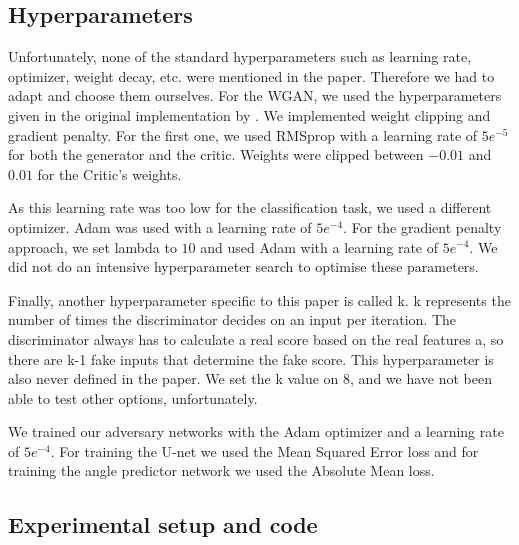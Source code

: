\subsection{Hyperparameters}

Unfortunately, none of the standard hyperparameters such as learning rate, optimizer, weight decay, etc. were mentioned in the paper. Therefore we had to adapt and choose them ourselves. For the WGAN, we used the hyperparameters given in the original implementation by \citet{pmlr-v70-arjovsky17a}.  We implemented weight clipping and gradient penalty. For the first one, we used RMSprop with a learning rate of $5e^{-5}$ for both the generator and the critic. Weights were clipped between $-0.01$ and $0.01$ for the Critic's weights. 

As this learning rate was too low for the classification task, we used a different optimizer. Adam was used with a learning rate of $5e^{-4}$. For the gradient penalty approach, we set lambda to $10$ and used Adam with a learning rate of $5e^{-4}$. We did not do an intensive hyperparameter search to optimise these parameters.

Finally, another hyperparameter specific to this paper is called k. k represents the number of times the discriminator decides on an input per iteration. The discriminator always has to calculate a real score based on the real features a, so there are k-1 fake inputs that determine the fake score. This hyperparameter is also never defined in the paper. We set the k value on 8, and we have not been able to test other options, unfortunately. 

We trained our adversary networks with the Adam optimizer and a learning rate of $5e^{-4}$. For training the U-net we used the Mean Squared Error loss and for training the angle predictor network we used the Absolute Mean loss.


\subsection{Experimental setup and code}

